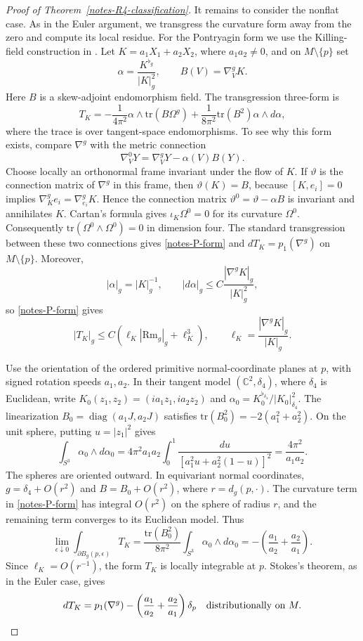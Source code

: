 \documentclass[letterpaper]{amsart}
\theoremstyle{definition}
\theoremstyle{remark}
\def\tr{\mathrm{tr}}
\def\Rm{\mathrm{Rm}}
\begin{document}
\begin{proof}[Proof of Theorem~\ref{notes-R4-classification}]
It remains to consider the nonflat case. As in the Euler argument, we
transgress the curvature form away from the zero and compute its local
residue. For the Pontryagin form we use the Killing-field construction in
\cite[Section~2.1, (3), p.~3119]{notes-Weber}.
Let $K=a_1X_1+a_2X_2$, where $a_1a_2\ne0$, and on $M\setminus\{p\}$ set
\[
 \alpha=\frac{K^{\flat_g}}{|K|_g^2},\qquad B(V)=\nabla_V^gK.
\]
Here $B$ is a skew-adjoint endomorphism field. The transgression three-form is
\begin{equation}\label{notes-P-form}
 T_K=-\frac1{4\pi^2}\alpha\wedge\tr(B\Omega^g)
       +\frac1{8\pi^2}\tr(B^2)\alpha\wedge d\alpha,
\end{equation}
where the trace is over tangent-space endomorphisms.
To see why this form exists, compare $\nabla^g$ with the metric connection
\[
 \nabla^0_VY=\nabla^g_VY-\alpha(V)B(Y).
\]
Choose locally an orthonormal frame invariant under the flow of $K$.
If $\vartheta$ is the connection matrix of $\nabla^g$ in this frame, then
$\vartheta(K)=B$, because $[K,e_i]=0$ implies
$\nabla_K^g e_i=\nabla_{e_i}^gK$. Hence the connection matrix
$\vartheta^0=\vartheta-\alpha B$ is invariant and annihilates $K$.
Cartan's formula gives $\iota_K\Omega^0=0$ for its curvature $\Omega^0$.
Consequently $\tr(\Omega^0\wedge\Omega^0)=0$ in dimension four.
The standard transgression between these two connections gives
\eqref{notes-P-form} and $dT_K=p_1(\nabla^g)$ on $M\setminus\{p\}$.
Moreover,
\[
 |\alpha|_g=|K|_g^{-1},\qquad
 |d\alpha|_g\le C\frac{|\nabla^gK|_g}{|K|_g^2},
\]
so \eqref{notes-P-form} gives
\[
 |T_K|_g\le C(\ell_K|\Rm_g|_g+\ell_K^3),\qquad
 \ell_K=\frac{|\nabla^gK|_g}{|K|_g}.
\]

Use the orientation of the ordered primitive normal-coordinate planes at
$p$, with signed rotation speeds $a_1,a_2$. In their tangent model
$(\mathbb C^2,\delta_4)$, where $\delta_4$ is Euclidean, write
$K_0(z_1,z_2)=(ia_1z_1,ia_2z_2)$ and
$\alpha_0=K_0^{\flat_{\delta_4}}/|K_0|_{\delta_4}^2$. The linearization
$B_0=\operatorname{diag}(a_1J,a_2J)$ satisfies
$\tr(B_0^2)=-2(a_1^2+a_2^2)$. On the unit sphere, putting
$u=|z_1|^2$ gives
\[
 \int_{S^3}\alpha_0\wedge d\alpha_0
 =4\pi^2a_1a_2\int_0^1
       \frac{du}{[a_1^2u+a_2^2(1-u)]^2}
 =\frac{4\pi^2}{a_1a_2}.
\]
The spheres are oriented outward. In equivariant normal coordinates,
$g=\delta_4+O(r^2)$ and $B=B_0+O(r^2)$, where $r=d_g(p,\cdot)$.
The curvature term in \eqref{notes-P-form} has integral $O(r^2)$ on the
sphere of radius $r$, and the remaining term converges to its Euclidean
model. Thus
\[
 \lim_{\epsilon\downarrow0}
 \int_{\partial B_g(p,\epsilon)}T_K
 =\frac{\tr(B_0^2)}{8\pi^2}\int_{S^3}\alpha_0\wedge d\alpha_0
 =-\left(\frac{a_1}{a_2}+\frac{a_2}{a_1}\right).
\]
Since $\ell_K=O(r^{-1})$, the form $T_K$ is locally integrable at $p$.
Stokes's theorem, as in the Euler case, gives
\begin{equation}\label{notes-P-transgression}
 dT_K=p_1(\nabla^g)
       -\left(\frac{a_1}{a_2}+\frac{a_2}{a_1}\right)\delta_p
 \quad\hbox{distributionally on }M.
\end{equation}


\end{proof}
\end{document}
